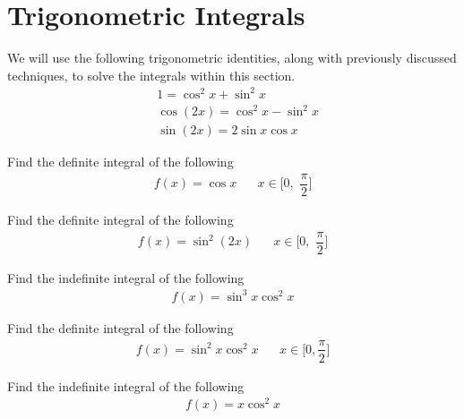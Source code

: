 \newpage
\section{Trigonometric Integrals}

\begin{recall}
We will use the following trigonometric identities, along with previously discussed techniques, to solve the integrals within this section.
\begin{align*}
    &1 = \cos^{2} x + \sin^{2} x\\[2ex]
    &\cos(2x) = \cos^{2} x - \sin^{2} x\\[2ex]
    &\sin(2x) = 2\sin x \cos x
\end{align*}
\end{recall}

\begin{exercise}
Find the definite integral of the following
\begin{align*}
    f(x) = \cos x \hspace{20pt} x \in \Big[0, \hspace{4pt} \dfrac{\pi}{2} \Big]
\end{align*}
\end{exercise}

\begin{exercise}
Find the definite integral of the following
\begin{align*}
    f(x) = \sin^{2}(2x) \hspace{20pt} x \in \Big[0, \hspace{4pt} \dfrac{\pi}{2} \Big]
\end{align*}
\end{exercise}

\begin{exercise}
Find the indefinite integral of the following
\begin{align*}
    f(x) = \sin^{3} x \cos^{2} x
\end{align*}
\end{exercise}

\begin{exercise}
Find the definite integral of the following
\begin{align*}
    f(x) = \sin^{2} x \cos^{2} x \hspace{20pt} x \in \Big[0, \dfrac{\pi}{2} \Big]
\end{align*}
\end{exercise}

\begin{exercise}
Find the indefinite integral of the following
\begin{align*}
    f(x) = x \cos^{2} x
\end{align*}
\end{exercise}

